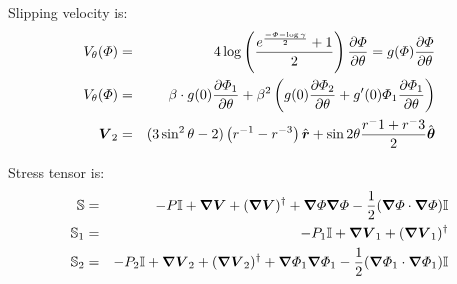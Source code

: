 Slipping velocity is:
\begin{eqnarray}
V_\theta(\varPhi) &=& 4\log\left(\frac{e^\frac{-\varPhi-\log\gamma}{2}+1}{2}\right)\frac{\partial \varPhi}{\partial \theta} 
= g(\varPhi) \frac{\partial \varPhi}{\partial \theta} 
\\
V_\theta(\varPhi) &=& \beta \cdot g(0) \frac{\partial \varPhi_1}{\partial \theta} +
\beta^2 \left(g(0) \frac{\partial \varPhi_2}{\partial \theta} + g'(0) \varPhi_1 \frac{\partial \varPhi_1}{\partial \theta}\right)
\\
\boldsymbol{V}_2 &=& (3\sin^2\theta - 2)\left(r^{-1} - r^{-3}\right) \hat{\boldsymbol{r}} + \sin2\theta\frac{r^-1+r^-3}{2}\hat{\boldsymbol{\theta}}
\end{eqnarray}

Stress tensor is:
\begin{eqnarray}
  \mathbb{S} &=& -P \mathbb{I} + \boldsymbol{\nabla} \boldsymbol{V} + (\boldsymbol{\nabla} \boldsymbol{V})^\dagger +
  \boldsymbol{\nabla} \varPhi \boldsymbol{\nabla} \varPhi - \frac{1}{2} (\boldsymbol{\nabla} \varPhi \cdot \boldsymbol{\nabla} \varPhi) \mathbb{I}
  \\
  \mathbb{S}_1 &=& -P_1 \mathbb{I} + \boldsymbol{\nabla} \boldsymbol{V}_1 + (\boldsymbol{\nabla} \boldsymbol{V}_1)^\dagger
  \\
  \mathbb{S}_2 &=& -P_2 \mathbb{I} + \boldsymbol{\nabla} \boldsymbol{V}_2 + (\boldsymbol{\nabla} \boldsymbol{V}_2)^\dagger + \boldsymbol{\nabla} \varPhi_1 \boldsymbol{\nabla} \varPhi_1 - \frac{1}{2} (\boldsymbol{\nabla} \varPhi_1 \cdot \boldsymbol{\nabla} \varPhi_1) \mathbb{I}
\end{eqnarray} 
